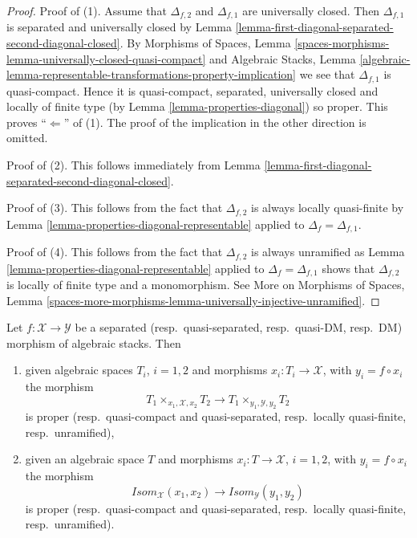 \begin{proof}
Proof of (1). Assume that $\Delta_{f, 2}$ and $\Delta_{f, 1}$ are
universally closed. Then $\Delta_{f, 1}$ is separated and universally
closed by
Lemma \ref{lemma-first-diagonal-separated-second-diagonal-closed}.
By
Morphisms of Spaces,
Lemma \ref{spaces-morphisms-lemma-universally-closed-quasi-compact}
and
Algebraic Stacks,
Lemma \ref{algebraic-lemma-representable-transformations-property-implication}
we see that $\Delta_{f, 1}$ is quasi-compact.
Hence it is quasi-compact, separated, universally closed and locally of
finite type (by
Lemma \ref{lemma-properties-diagonal})
so proper. This proves ``$\Leftarrow$'' of (1).
The proof of the implication in the other direction is omitted.

\medskip\noindent
Proof of (2). This follows immediately from
Lemma \ref{lemma-first-diagonal-separated-second-diagonal-closed}.

\medskip\noindent
Proof of (3). This follows from the fact that $\Delta_{f, 2}$ is always locally
quasi-finite by
Lemma \ref{lemma-properties-diagonal-representable}
applied to $\Delta_f = \Delta_{f, 1}$.

\medskip\noindent
Proof of (4). This follows from the fact that $\Delta_{f, 2}$ is always
unramified as
Lemma \ref{lemma-properties-diagonal-representable}
applied to $\Delta_f = \Delta_{f, 1}$ shows that
$\Delta_{f, 2}$ is locally of finite type and a monomorphism.
See
More on Morphisms of Spaces,
Lemma \ref{spaces-more-morphisms-lemma-universally-injective-unramified}.
\end{proof}

\begin{lemma}
\label{lemma-separated-implies-isom}
Let $f : \mathcal{X} \to \mathcal{Y}$ be a separated
(resp.\ quasi-separated, resp.\ quasi-DM, resp.\ DM)
morphism of algebraic stacks. Then
\begin{enumerate}
\item given algebraic spaces $T_i$, $i = 1, 2$ and morphisms
$x_i : T_i \to \mathcal{X}$, with $y_i = f \circ x_i$ the morphism
$$
T_1 \times_{x_1, \mathcal{X}, x_2} T_2 \longrightarrow
T_1 \times_{y_1, \mathcal{Y}, y_2} T_2
$$
is proper (resp.\ quasi-compact and quasi-separated,
resp.\ locally quasi-finite, resp.\ unramified),
\item given an algebraic space $T$ and morphisms
$x_i : T \to \mathcal{X}$, $i = 1, 2$, with $y_i = f \circ x_i$ the morphism
$$
\mathit{Isom}_\mathcal{X}(x_1, x_2) \longrightarrow
\mathit{Isom}_\mathcal{Y}(y_1, y_2)
$$
is proper (resp.\ quasi-compact and quasi-separated,
resp.\ locally quasi-finite, resp.\ unramified).
\end{enumerate}
\end{lemma}

